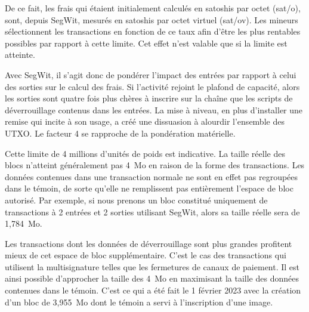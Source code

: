De ce fait, les frais qui étaient initialement calculés en satoshis par octet (sat/o), sont, depuis SegWit, mesurés en satoshis par octet virtuel (sat/ov). Les mineurs sélectionnent les transactions en fonction de ce taux afin d'être les plus rentables possibles par rapport à cette limite. Cet effet n'est valable que si la limite est atteinte.

Avec SegWit, il s'agit donc de pondérer l'impact des entrées par rapport à celui des sorties sur le calcul des frais. Si l'activité rejoint le plafond de capacité, alors les sorties sont quatre fois plus chères à inscrire sur la chaîne que les scripts de déverrouillage contenus dans les entrées. La mise à niveau, en plus d'installer une remise qui incite à son usage, a créé une dissuasion à alourdir l'ensemble des UTXO. Le facteur 4 se rapproche de la pondération matérielle.

Cette limite de 4 millions d'unités de poids est indicative. La taille réelle des blocs n'atteint généralement pas 4~Mo en raison de la forme des transactions. Les données contenues dans une transaction normale ne sont en effet pas regroupées dans le témoin, de sorte qu'elle ne remplissent pas entièrement l'espace de bloc autorisé. Par exemple, si nous prenons un bloc constitué uniquement de transactions à 2 entrées et 2 sorties utilisant SegWit, alors sa taille réelle sera de 1,784~Mo.

Les transactions dont les données de déverrouillage sont plus grandes profitent mieux de cet espace de bloc supplémentaire. C'est le cas des transactions qui utilisent la multisignature telles que les fermetures de canaux de paiement. Il est ainsi possible d'approcher la taille des 4~Mo en maximisant la taille des données contenues dans le témoin. C'est ce qui a été fait le 1\ier{} février 2023 avec la création d'un bloc de 3,955~Mo dont le témoin a servi à l'inscription d'une image.

